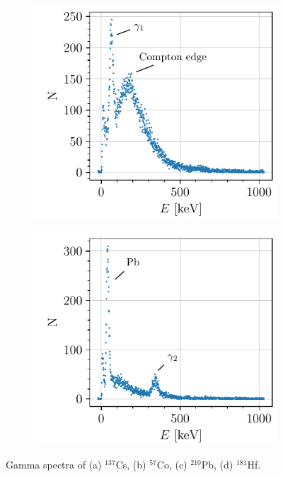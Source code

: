\begin{figure}[htbp]
\begin{subfigure}{0.495\textwidth}
        \includegraphics[scale=1]{figures/pb210_spectrum.pdf}
        \caption{}
    \end{subfigure}
    \hfill
    \begin{subfigure}{0.495\textwidth}
        \includegraphics[scale=1]{figures/hf181_spectrum.pdf}
        \caption{}
    \end{subfigure}
    \caption{Gamma spectra of (a) $^{137}$Cs, (b) $^{57}$Co, (c) $^{210}$Pb, (d) $^{181}$Hf.}
    \label{fig:gamma_spectra}
\end{figure}


